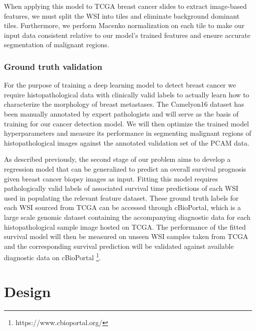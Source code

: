 \documentclass{l4proj}
\begin{document}
When applying this model to TCGA breast cancer slides to extract image-based features, we must split the WSI into tiles and eliminate background dominant tiles. Furthermore, we perform Macenko normalization on each tile to make our input data  consistent relative to our model's trained features and ensure accurate segmentation of malignant regions. 

\subsection{Ground truth validation}
For the purpose of training a deep learning model to detect breast cancer we require histopathological data with clinically valid labels to actually learn how to characterize the morphology of breast metastases. The Camelyon16 dataset has been manually annotated by expert pathologists and will serve as the basis of training for our cancer detection model. We will then optimize the trained model hyperparameters and measure its performance in segmenting malignant regions of histopathological images against the annotated validation set of the PCAM data. 

As described previously, the second stage of our problem aims to develop a regression model that can be generalized to predict an overall survival prognosis given breast cancer biopsy images as input. Fitting this model requires pathologically valid labels of associated survival time predictions of each WSI used in populating the relevant feature dataset. These ground truth labels for each WSI sourced from TCGA can be accessed through cBioPortal, which is a large scale genomic dataset containing the accompanying diagnostic data for each histopathological sample image hosted on TCGA. The performance of the fitted survival model will then be measured on unseen WSI samples taken from TCGA and the corresponding survival prediction will be validated against available diagnostic data on cBioPortal \footnote{https://www.cbioportal.org/}. 

\chapter{Design}
\end{document}
